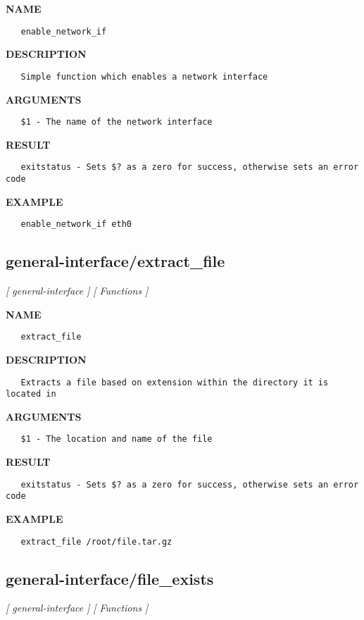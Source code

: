 \label{ch:robo26}
\label{ch:general_interface_enable_network_if}
\textbf{NAME}
\begin{verbatim}
   enable_network_if
\end{verbatim}
\textbf{DESCRIPTION}
\begin{verbatim}
   Simple function which enables a network interface
\end{verbatim}
\textbf{ARGUMENTS}
\begin{verbatim}
   $1 - The name of the network interface
\end{verbatim}
\textbf{RESULT}
\begin{verbatim}
   exitstatus - Sets $? as a zero for success, otherwise sets an error code
\end{verbatim}
\textbf{EXAMPLE}
\begin{verbatim}
   enable_network_if eth0
\end{verbatim}
\newpage
\subsection{general-interface/extract\_file}
\textsl{[ general-interface ]}
\textsl{[ Functions ]}

\label{ch:robo27}
\label{ch:general_interface_extract_file}
\textbf{NAME}
\begin{verbatim}
   extract_file
\end{verbatim}
\textbf{DESCRIPTION}
\begin{verbatim}
   Extracts a file based on extension within the directory it is located in
\end{verbatim}
\textbf{ARGUMENTS}
\begin{verbatim}
   $1 - The location and name of the file
\end{verbatim}
\textbf{RESULT}
\begin{verbatim}
   exitstatus - Sets $? as a zero for success, otherwise sets an error code
\end{verbatim}
\textbf{EXAMPLE}
\begin{verbatim}
   extract_file /root/file.tar.gz
\end{verbatim}
\newpage
\subsection{general-interface/file\_exists}
\textsl{[ general-interface ]}
\textsl{[ Functions ]}

